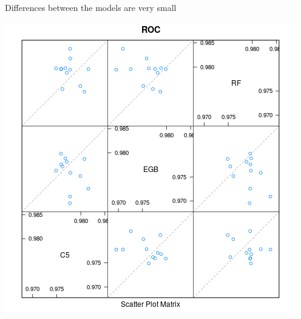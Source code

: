 \documentclass[12pt,a4paper,leqno]{report}
\theoremstyle{plain}
\theoremstyle{definition}
\theoremstyle{remark}
\begin{document}
Differences between the models are very small

\bigskip
{
    \centering
    \includegraphics[width=\textwidth,height=\textheight,keepaspectratio]{model_prediction_correlations.png}
    \par
}
\bigskip






\end{document}
